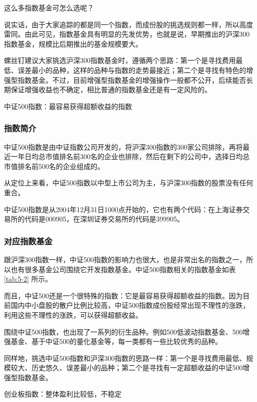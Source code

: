 


这么多指数基金可怎么选呢？

说实话，由于大家追踪的都是同一个指数，而成份股的挑选规则都一样，所以高度雷同。由此可见，指数基金具有明显的先发优势，也就是说，早期推出的沪深300指数基金，规模比后期推出的基金规模要大。

螺丝钉建议大家挑选沪深300指数基金时，遵循两个思路：第一个是寻找费用最低、误差最小的品种，这样的品种与指数的走势最接近；第二个是寻找有特色的增强型指数基金。不过，目前增强型指数基金的增强操作一般都不公开，后续能否长期保证增强收益也不确定，相比普通的指数基金还是有一定风险的。

{\fangsong 中证500指数：最容易获得超额收益的指数}

\subsubsection{指数简介}

中证500指数是由中证指数公司开发的，将沪深300指数的300家公司排除，再将最近一年日均总市值排名前300名的企业也排除，然后在剩下的公司中，选择日均总市值排名前500名的企业组成的。

从定位上来看，中证500指数以中型上市公司为主，与沪深300指数的股票没有任何重合。

中证500指数是从2004年12月31日1000点开始的，它也有两个代码：在上海证券交易所的代码是000905，在深圳证券交易所的代码是399905。

\subsubsection{对应指数基金}

跟沪深300指数一样，中证500指数的影响力也很大，也是非常出名的指数之一，所以也有很多基金公司围绕它开发指数基金。中证500指数相关的指数基金如表 \ref{tab:5-2} 所示。




而且，中证500还是一个很特殊的指数：它是最容易获得超额收益的指数。因为目前国内中小盘股的散户比例比较高，中证500指数成份股经常出现不理性的涨跌，利用这些不理性的涨跌，可以获得超额收益。

围绕中证500指数，也出现了一系列的衍生品种。例如500低波动指数基金、500增强基金、基于中证500的量化基金等，每一类都有一些比较优秀的品种。

同样地，挑选中证500指数和沪深300指数的思路一样：第一个是寻找费用最低、规模较大、历史悠久、误差最小的品种；第二个是寻找有一定超额收益的中证500增强型指数基金。

{\fangsong 创业板指数：整体盈利比较低，不稳定}

